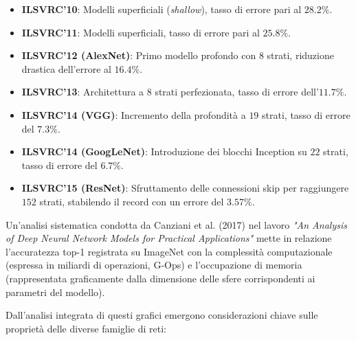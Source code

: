 ﻿\documentclass[11pt, a4paper]{article}
\begin{document}
\begin{itemize}
    \item \textbf{ILSVRC'10}: Modelli superficiali (\emph{shallow}), tasso di errore pari al $28.2\%$.
    \item \textbf{ILSVRC'11}: Modelli superficiali, tasso di errore pari al $25.8\%$.
    \item \textbf{ILSVRC'12 (AlexNet)}: Primo modello profondo con $8$ strati, riduzione drastica dell'errore al $16.4\%$.
    \item \textbf{ILSVRC'13}: Architettura a $8$ strati perfezionata, tasso di errore dell'$11.7\%$.
    \item \textbf{ILSVRC'14 (VGG)}: Incremento della profondità a $19$ strati, tasso di errore del $7.3\%$.
    \item \textbf{ILSVRC'14 (GoogLeNet)}: Introduzione dei blocchi Inception su $22$ strati, tasso di errore del $6.7\%$.
    \item \textbf{ILSVRC'15 (ResNet)}: Sfruttamento delle connessioni skip per raggiungere $152$ strati, stabilendo il record con un errore del $3.57\%$.
\end{itemize}


Un'analisi sistematica condotta da Canziani et al. (2017) nel lavoro \emph{"An Analysis of Deep Neural Network Models for Practical Applications"} mette in relazione l'accuratezza top-1 registrata su ImageNet con la complessità computazionale (espressa in miliardi di operazioni, G-Ops) e l'occupazione di memoria (rappresentata graficamente dalla dimensione delle sfere corrispondenti ai parametri del modello).


Dall'analisi integrata di questi grafici emergono considerazioni chiave sulle proprietà delle diverse famiglie di reti:
\end{document}
